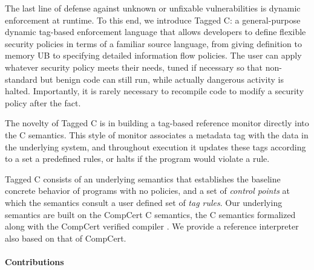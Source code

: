 \documentclass{llncs}
\begin{document}
The last line of defense against unknown or unfixable vulnerabilities is dynamic enforcement at
runtime. To this end, we introduce Tagged C: a general-purpose dynamic tag-based enforcement language
that allows developers to define flexible security policies in terms of a familiar source language,
from giving definition to memory UB to specifying detailed information flow policies.
The user can apply whatever security policy meets their needs,
tuned if necessary so that non-standard but benign code can still run, while actually dangerous activity
is halted. Importantly, it is rarely necessary to recompile code to modify a security policy
after the fact.

The novelty of Tagged C is in building a tag-based reference monitor directly into the C semantics.
This style of monitor associates a metadata tag with the data in the underlying system,
and throughout execution it updates these tags according to a set a predefined rules, or halts if
the program would violate a rule.

Tagged C consists of an underlying semantics that establishes the baseline concrete behavior of programs
with no policies, and a set of {\em control points} at which the semantics consult a user defined set of
{\em tag rules}. Our underlying semantics are built on the CompCert C semantics, the C semantics formalized
along with the CompCert verified compiler \cite{Leroy09:CompCert}. We provide a reference interpreter
also based on that of CompCert.


\paragraph{Contributions}
\end{document}
